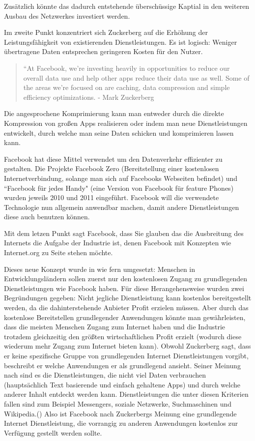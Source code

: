 \documentclass{article}
\begin{document}
Zusätzlich könnte das dadurch entstehende überschüssige Kaptial in den weiteren Ausbau des Netzwerkes investiert werden.

\medskip

Im zweite Punkt konzentriert sich Zuckerberg auf die Erhöhung der Leistungsfähigkeit von existierenden Dienstleistungen.
Es ist logisch: Weniger übertragene Daten entsprechen geringeren Kosten für den Nutzer.

\begin{quote}
``At Facebook, we’re investing heavily in opportunities to reduce our overall data use and help  other apps     
reduce their data use as well. Some of the areas we’re focused on are caching, data compression and simple efficiency optimizations.
- Mark Zuckerberg \textcite[8]{HumanRight}
\end{quote}

Die angesprochene Komprimierung kann man entweder durch die direkte Kompression von großen Apps realisieren oder indem man neue Dienstleistungen entwickelt, durch welche man seine Daten schicken und komprimieren lassen kann.

Facebook hat diese Mittel verwendet um den Datenverkehr effizienter zu gestalten.
Die Projekte Facebook Zero (Bereitstellung einer kostenlosen Internetverbindung, solange man sich auf Facebooks Webseiten befindet) und ``Facebook für jedes Handy" (eine Version von Facebook für feature Phones) wurden jeweils  2010 und 2011 eingeführt.
Facebook will die verwendete Technologie nun allgemein anwendbar machen, damit andere Dienstleistungen diese auch benutzen können.

\medskip

Mit dem letzen Punkt sagt Facebook, dass Sie glauben das die Ausbreitung des Internets die Aufgabe der Industrie ist, denen Facebook mit Konzepten wie Internet.org zu Seite stehen möchte.

Dieses neue Konzept wurde in wie fern umgesetzt: Menschen in Entwicklungsländern sollen zuerst nur den kostenlosen Zugang zu grundlegenden Dienstleistungen wie Facebook haben.
Für diese Herangehensweise wurden zwei Begründungen gegeben:
\medskip
Nicht jegliche Dienstleistung kann kostenlos bereitgestellt werden, da die dahinterstehende Anbieter Profit erzielen müssen. 
Aber durch das kostenlose Bereitstellen grundlegender Anwendungen könnte man gewährleisten, dass die meisten Menschen Zugang zum Internet haben und die Industrie trotzdem gleichzeitig den größten wirtschaftlichen Profit erzielt (wodurch diese wiederum mehr Zugang zum Internet bieten kann).
Obwohl Zuckerberg sagt, dass er keine spezifische Gruppe von grundlegenden Internet Dienstleistungen vorgibt, beschreibt er welche Anwendungen er als grundlegend ansieht.
Seiner Meinung nach sind es die Dienstleistungen, die nicht viel Daten verbrauchen (hauptsächlich Text basierende und einfach gehaltene Apps) und durch welche anderer Inhalt entdeckt werden kann.
Dienstleistungen die unter diesen Kriterien fallen sind zum Beispiel Messengers, soziale Netzwerke, Suchmaschinen und Wikipedia.(\cite[5]{HumanRight})
Also ist Facebook nach Zuckerbergs Meinung eine grundlegende Internet Dienstleistung, die vorrangig zu anderen Anwendungen kostenlos zur Verfügung gestellt werden sollte.
\end{document}
